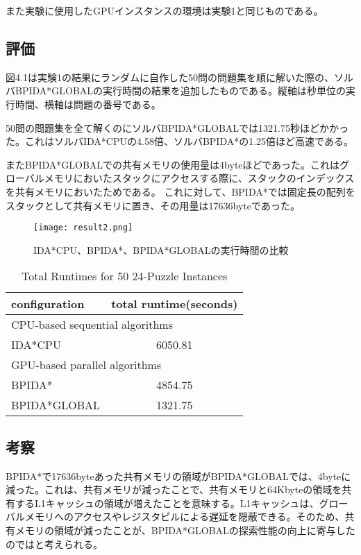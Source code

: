\documentclass[a4paper,11pt,oneside,openany]{jsbook}
\begin{document}
また実験に使用したGPUインスタンスの環境は実験1と同じものである。


\subsection{評価}
図4.1は実験1の結果にランダムに自作した50問の問題集を順に解いた際の、ソルバBPIDA*GLOBALの実行時間の結果を追加したものである。縦軸は秒単位の実行時間、横軸は問題の番号である。

50問の問題集を全て解くのにソルバBPIDA*GLOBALでは1321.75秒ほどかかった。これはソルバIDA*CPUの4.58倍、ソルバBPIDA*の1.25倍ほど高速である。

またBPIDA*GLOBALでの共有メモリの使用量は4byteほどであった。これはグローバルメモリにおいたスタックにアクセスする際に、スタックのインデックスを共有メモリにおいたためである。
これに対して、BPIDA*では固定長の配列をスタックとして共有メモリに置き、その用量は17636byteであった。

\begin{figure}[H]
\begin{center}
\texttt{[image: result2.png]}
\caption{IDA*CPU、BPIDA*、BPIDA*GLOBALの実行時間の比較}
\end{center}
\end{figure}

\begin{table}[H]
\centering
\caption{Total Runtimes for 50 24-Puzzle Instances}
\label{my-label}
\begin{tabular}{|l|c|}
\hline
configuration & \multicolumn{1}{l|}{total runtime(seconds)} \\ \hline
\multicolumn{2}{|l|}{CPU-based sequential algorithms} \\ \hline
IDA*CPU & 6050.81 \\ \hline
\multicolumn{2}{|l|}{GPU-based parallel algorithms} \\ \hline
BPIDA* & 4854.75 \\
BPIDA*GLOBAL & 1321.75 \\  \hline
\end{tabular}
\end{table}


\subsection{考察}
BPIDA*で17636byteあった共有メモリの領域がBPIDA*GLOBALでは、4byteに減った。これは、共有メモリが減ったことで、共有メモリと64Kbyteの領域を共有するL1キャッシュの領域が増えたことを意味する。L1キャッシュは、グローバルメモリへのアクセスやレジスタピルによる遅延を隠蔽できる。そのため、共有メモリの領域が減ったことが、BPIDA*GLOBALの探索性能の向上に寄与したのではと考えられる。
\end{document}
